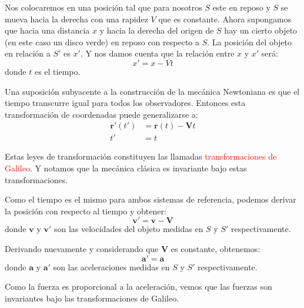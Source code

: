 \documentclass[../main]{subfiles}
\begin{document}
\begin{adjustwidth}{0pt}{-100pt}
            Nos colocaremos en una posición tal que para nosotros $S$ este en reposo y $S$ se mueva hacia la derecha con una rapidez $V$ que es constante. Ahora supongamos que hacia una distancia $x$ y hacia la derecha del origen de $S$ hay un cierto objeto (en este caso un disco verde) en reposo con respecto a $S$. La posición del objeto en relación a $S'$ es $x'$. Y nos damos cuenta que la relación entre $x$ y $x'$ será:
            \begin{equation}
                x'=x-Vt
            \end{equation}
            donde $t$ es el tiempo.

            Una suposición subyacente a la construcción de la mecánica Newtoniana es que el tiempo transcurre igual para todos los observadores. Entonces esta transformación de coordenadas puede generalizarse a:
            \begin{equation}
                \begin{aligned}
                    \mathbf{r}'(t')&=\mathbf{r}(t)-\mathbf{V}t \\
                    t'&=t
                \end{aligned}
            \end{equation}

            Estas leyes de transformación constituyen las llamadas \textcolor{red}{transformaciones de Galileo}. Y notamos que la mecánica clásica es invariante bajo estas transformaciones. 
            
            Como el tiempo es el mismo para ambos sistemas de referencia, podemos derivar la posición con respecto al tiempo y obtener:
            \begin{equation}
                \mathbf{v}'=\mathbf{v}-\mathbf{V}
            \end{equation}
            donde $\mathbf{v}$ y $\mathbf{v}'$ son las velocidades del objeto medidas en $S$ y $S'$ respectivamente.

            Derivando nuevamente y considerando que $\mathbf{V}$ es constante, obtenemos:
            \begin{equation}
                \mathbf{a}'=\mathbf{a}
            \end{equation}
            donde $\mathbf{a}$ y $\mathbf{a}'$ son las aceleraciones medidas en $S$ y $S'$ respectivamente.

            Como la fuerza es proporcional a la aceleración, vemos que las fuerzas son invariantes bajo las transformaciones de Galileo.


\end{adjustwidth}
\end{document}

